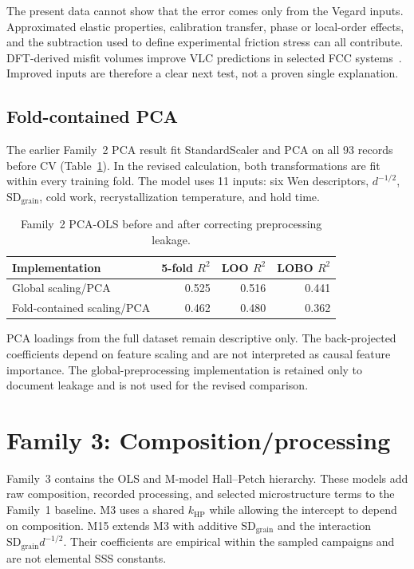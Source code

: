 \documentclass[a4paper,11pt]{article}
\newcommand{\familythree}{Composition\slash processing}
\begin{document}
The present data cannot show that the error comes only from the Vegard inputs. Approximated elastic properties, calibration transfer, phase or local-order effects, and the subtraction used to define experimental friction stress can all contribute. DFT-derived misfit volumes improve VLC predictions in selected FCC systems~\cite{Moitzi2022}. Improved inputs are therefore a clear next test, not a proven single explanation.

\subsection{Fold-contained PCA}

The earlier Family~2 PCA result fit StandardScaler and PCA on all 93 records before CV (Table~\ref{tab:pca}). In the revised calculation, both transformations are fit within every training fold. The model uses 11 inputs: six Wen descriptors, $d^{-1/2}$, $\mathrm{SD}_{\mathrm{grain}}$, cold work, recrystallization temperature, and hold time.

\begin{table}[H]
\centering
\caption{Family~2 PCA-OLS before and after correcting preprocessing leakage.}
\label{tab:pca}
\begin{tabular}{lrrr}
\toprule
Implementation & 5-fold $R^2$ & LOO $R^2$ & LOBO $R^2$ \\
\midrule
Global scaling/PCA & 0.525 & 0.516 & 0.441 \\
Fold-contained scaling/PCA & 0.462 & 0.480 & 0.362 \\
\bottomrule
\end{tabular}
\end{table}

PCA loadings from the full dataset remain descriptive only. The back-projected coefficients depend on feature scaling and are not interpreted as causal feature importance. The global-preprocessing implementation is retained only to document leakage and is not used for the revised comparison.

\section{Family 3: \familythree}
\label{si:composition}

Family~3 contains the OLS and M-model Hall--Petch hierarchy. These models add raw composition, recorded processing, and selected microstructure terms to the Family~1 baseline. M3 uses a shared $k_{\mathrm{HP}}$ while allowing the intercept to depend on composition. M15 extends M3 with additive $\mathrm{SD}_{\mathrm{grain}}$ and the interaction $\mathrm{SD}_{\mathrm{grain}}d^{-1/2}$. Their coefficients are empirical within the sampled campaigns and are not elemental SSS constants.
\end{document}
